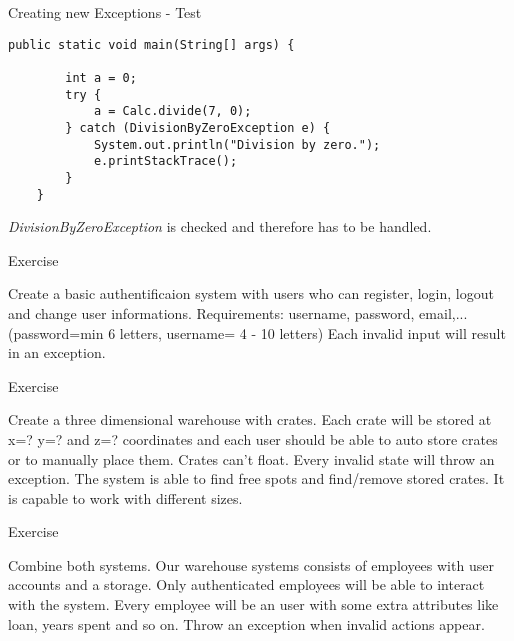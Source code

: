 \begin{frame}[fragile]{Creating new Exceptions - Test}
	\begin{lstlisting}[basicstyle=\ttfamily\scriptsize]
	public static void main(String[] args) {
	
		int a = 0;
		try {
			a = Calc.divide(7, 0);
		} catch (DivisionByZeroException e) {
			System.out.println("Division by zero.");
			e.printStackTrace();
		}
	}
	\end{lstlisting}	
	\emph{DivisionByZeroException} is checked and therefore has to be handled.
\end{frame}

\begin{frame}{Exercise}
\begin{itemize}
	Create a basic authentificaion system with users who can register, login, logout and change user informations.
	Requirements: username, password, email,... (password=min 6 letters, username= 4  - 10 letters)
	Each invalid input will result in an exception.
\end{itemize}
\end{frame}
\begin{frame}{Exercise}
\begin{itemize}
	Create a three dimensional warehouse with crates. Each crate will be stored at x=? y=? and z=? coordinates and 
	each user should be able to auto store crates or to manually place them. Crates can't float. Every invalid state will throw an exception.
	The system is able to find free spots and find/remove stored crates. It is capable to work with different sizes.
\end{itemize}
\end{frame}
\begin{frame}{Exercise}
\begin{itemize}
	Combine both systems. Our warehouse systems consists of employees with user accounts and a storage.
	Only authenticated employees will be able to interact with the system.
	Every employee will be an user with some extra attributes like loan, years spent and so on.
	Throw an exception when invalid actions appear.
\end{itemize}
\end{frame}



